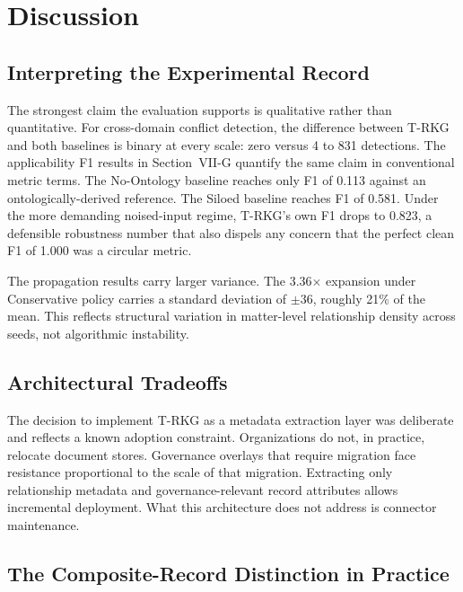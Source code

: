 \documentclass{ieeeaccess}
\begin{document}
\section{Discussion}

\subsection{Interpreting the Experimental Record}

The strongest claim the evaluation supports is qualitative rather than quantitative. For cross-domain conflict detection, the difference between T-RKG and both baselines is binary at every scale: zero versus 4 to 831 detections. The applicability F1 results in Section~VII-G quantify the same claim in conventional metric terms. The No-Ontology baseline reaches only F1 of 0.113 against an ontologically-derived reference. The Siloed baseline reaches F1 of 0.581. Under the more demanding noised-input regime, T-RKG's own F1 drops to 0.823, a defensible robustness number that also dispels any concern that the perfect clean F1 of 1.000 was a circular metric.

The propagation results carry larger variance. The 3.36$\times$ expansion under Conservative policy carries a standard deviation of $\pm 36$, roughly 21\% of the mean. This reflects structural variation in matter-level relationship density across seeds, not algorithmic instability.

\subsection{Architectural Tradeoffs}

The decision to implement T-RKG as a metadata extraction layer was deliberate and reflects a known adoption constraint. Organizations do not, in practice, relocate document stores. Governance overlays that require migration face resistance proportional to the scale of that migration. Extracting only relationship metadata and governance-relevant record attributes allows incremental deployment. What this architecture does not address is connector maintenance.

\subsection{The Composite-Record Distinction in Practice}
\end{document}
